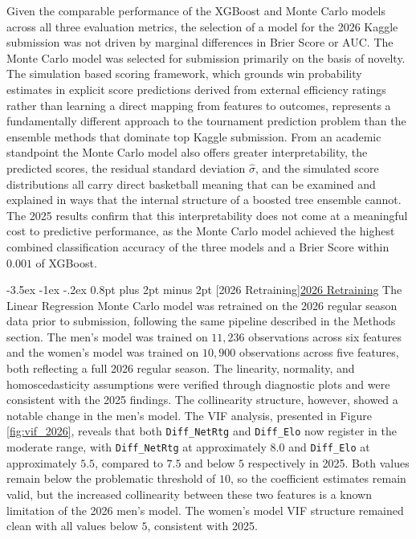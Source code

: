 \documentclass[12pt,leqno]{article}\usepackage[pdftex]{graphicx}\usepackage[dvipsnames]{xcolor}
\makeatletter
\renewcommand\subsubsection{\@startsection {subsubsection}{1}{\z@}%
{-3.5ex \@plus -1ex \@minus -.2ex}%
{0.8pt plus 2pt minus 2pt}%
{\normalfont}}
\newcommand{\usubsubsection}[1]{\subsubsection[#1]{\normalfont\normalfont\underline{#1}}}%
\theoremstyle{remark}
\makeatother
\begin{document}
Given the comparable performance of the XGBoost and Monte Carlo models across all three evaluation metrics, the selection of a model for the 2026 Kaggle submission was not driven by marginal differences in Brier Score or AUC. The Monte Carlo model was selected for submission primarily on the basis of novelty. The simulation based scoring framework, which grounds win probability estimates in explicit score predictions derived from external efficiency ratings rather than learning a direct mapping from features to outcomes, represents a fundamentally different approach to the tournament prediction problem than the ensemble methods that dominate top Kaggle submission. From an academic standpoint the Monte Carlo model also offers greater interpretability, the predicted scores, the residual standard deviation $\hat{\sigma}$, and the simulated score distributions all carry direct basketball meaning that can be examined and explained in ways that the internal structure of a boosted tree ensemble cannot. The 2025 results confirm that this interpretability does not come at a meaningful cost to predictive performance, as the Monte Carlo model achieved the highest combined classification accuracy of the three models and a Brier Score within $0.001$ of XGBoost.





\usubsubsection{2026 Retraining}
The Linear Regression Monte Carlo model was retrained on the 2026 regular season data prior to submission, following the same pipeline described in the Methods section. The men's model was trained on $11,236$ observations across six features and the women's model was trained on $10,900$ observations across five features, both reflecting a full 2026 regular season. The linearity, normality, and homoscedasticity assumptions were verified through diagnostic plots and were consistent with the 2025 findings. The collinearity structure, however, showed a notable change in the men's model. The VIF analysis, presented in Figure \ref{fig:vif_2026}, reveals that both \texttt{Diff\_NetRtg} and \texttt{Diff\_Elo} now register in the moderate range, with \texttt{Diff\_NetRtg} at approximately $8.0$ and \texttt{Diff\_Elo} at approximately $5.5$, compared to $7.5$ and below $5$ respectively in 2025. Both values remain below the problematic threshold of $10$, so the coefficient estimates remain valid, but the increased collinearity between these two features is a known limitation of the 2026 men's model. The women's model VIF structure remained clean with all values below $5$, consistent with 2025.
\end{document}
